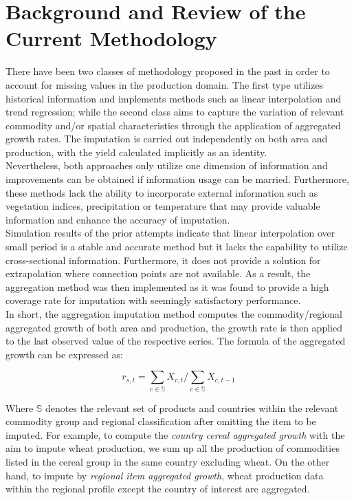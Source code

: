 \documentclass[nojss]{jss}\usepackage[]{graphicx}\usepackage[]{color}
\begin{document}
\FloatBarrier
\section{Background and Review of the Current Methodology}

There have been two classes of methodology proposed in the past in
order to account for missing values in the production domain. The
first type utilizes historical information and implements methods such
as linear interpolation and trend regression; while the second class
aims to capture the variation of relevant commodity
and/or spatial characteristics through the application of
aggregated growth rates. The imputation is carried out independently
on both area and production, with the yield calculated implicitly as
an identity.\\

Nevertheless, both approaches only utilize one dimension of
information and improvements can be obtained if information usage
can be married. Furthermore, these methods lack the ability to
incorporate external information such as vegetation indices,
precipitation or temperature that may provide valuable information and
enhance the accuracy of imputation.\\

Simulation results of the prior attempts indicate that linear
interpolation over small period is a stable and accurate method but it
lacks the capability to utilize cross-sectional
information. Furthermore, it does not provide a solution for
extrapolation where connection points are not available. As a result,
the aggregation method was then implemented as it was found to provide
a high coverage rate for imputation with seemingly satisfactory
performance.\\

In short, the aggregation imputation method computes the
commodity/regional aggregated growth of both area and production, the
growth rate is then applied to the last observed value of the
respective series. The formula of the aggregated growth can be
expressed as:

\begin{equation}
  \label{eq:aggregateGrowth}
  r_{s, t} = \sum_{c \in \mathbb{S}} X_{c, t}/\sum_{c \in \mathbb{S}} X_{c, t-1}
\end{equation}

Where $\mathbb{S}$ denotes the relevant set of products and countries
within the relevant commodity group and regional classification after
omitting the item to be imputed. For example, to compute the
\textit{country cereal aggregated growth} with the aim to impute wheat
production, we sum up all the production of commodities listed in the
cereal group in the same country excluding wheat. On the other hand,
to impute by \textit{regional item aggregated growth}, wheat
production data within the regional profile except the country of
interest are aggregated.\\
\end{document}
